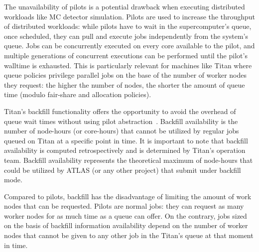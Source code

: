 The unavailability of pilots is a potential drawback when executing distributed
workloads like MC detector simulation. Pilots are used to increase the
throughput of distributed workloads: while pilots have to wait in the
supercomputer's queue, once scheduled, they can pull and execute jobs
independently from the system's queue. Jobs can be concurrently executed on
every core available to the pilot, and multiple generations of concurrent
executions can be performed until the pilot's walltime is exhausted. This is
particularly relevant for machines like Titan where queue policies privilege
parallel jobs on the base of the number of worker nodes they request: the higher
the number of nodes, the shorter the amount of queue time (modulo fair-share and
allocation policies).



Titan’s backfill functionality offers the opportunity to avoid the overhead of
queue wait times without using pilot abstraction~\cite{maui_backfill_url}.
Backfill availability is the number of node-hours (or core-hours) that cannot be
utilized by regular jobs queued on Titan at a specific point in time.  It is
important to note that backfill availability is computed retrospectively and is
determined by Titan's operation team. Backfill availability represents the
theoretical maximum of node-hours that could be utilized by ATLAS (or any other
project) that submit under backfill mode.

Compared to pilots, backfill has the disadvantage of limiting the amount of work
nodes that can be requested. Pilots are normal jobs: they can request as many
worker nodes for as much time as a queue can offer. On the contrary, jobs sized
on the basis of backfill information availability depend on the number of worker
nodes that cannot be given to any other job in the Titan's queue at that moment
in time.

